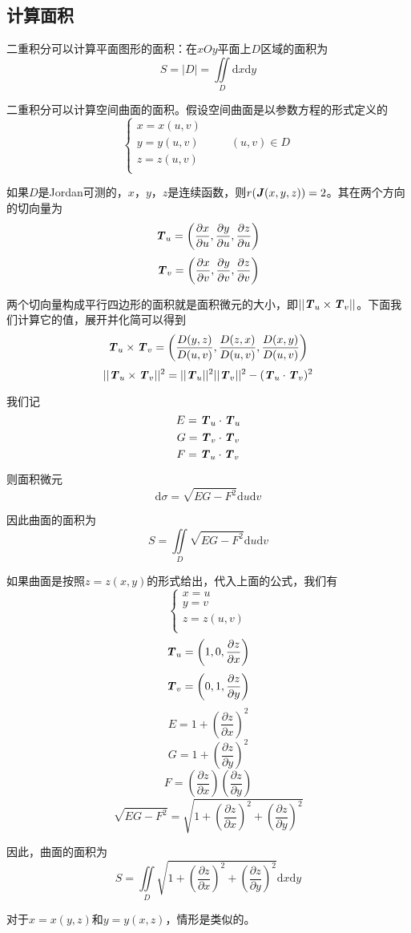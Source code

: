 \documentclass[UTF8,openany]{book}
\begin{document}
	\subsection{计算面积}
	二重积分可以计算平面图形的面积：在$xOy$平面上$D$区域的面积为
	$$S=|D|=\iint\limits_{D}\mathrm{d}x\mathrm{d}y$$
	\par 二重积分可以计算空间曲面的面积。假设空间曲面是以参数方程的形式定义的
	$$\begin{cases}
	x=x(u,v)\\
	y=y(u,v)\quad & \quad(u,v)\in D\\
	z=z(u,v)\\
	\end{cases}$$
	\par 如果$D$是Jordan可测的，$x$，$y$，$z$是连续函数，则$r(\textbf{\textit{J}}(x,y,z))=2$。其在两个方向的切向量为
	$$\textbf{\textit{T}}_u=\left(\frac{\partial x}{\partial u},\frac{\partial y}{\partial u},\frac{\partial z}{\partial u}\right)$$
	$$\textbf{\textit{T}}_v=\left(\frac{\partial x}{\partial v},\frac{\partial y}{\partial v},\frac{\partial z}{\partial v}\right)$$
	\par 两个切向量构成平行四边形的面积就是面积微元的大小，即$||\textbf{\textit{T}}_u\times \textbf{\textit{T}}_v||$。下面我们计算它的值，展开并化简可以得到
	$$\textbf{\textit{T}}_u\times \textbf{\textit{T}}_v=\left(\frac{D(y,z)}{D(u,v)},\frac{D(z,x)}{D(u,v)},\frac{D(x,y)}{D(u,v)}\right)$$
	$$||\textbf{\textit{T}}_u\times\textbf{\textit{T}}_v||^2=||\textbf{\textit{T}}_u||^2||\textbf{\textit{T}}_v||^2-(\textbf{\textit{T}}_u\cdot \textbf{\textit{T}}_v)^2$$
	\par 我们记
	$$E=\textbf{\textit{T}}_u\cdot \textbf{\textit{T}}_u$$
	$$G=\textbf{\textit{T}}_v\cdot \textbf{\textit{T}}_v$$
	$$F=\textbf{\textit{T}}_u\cdot \textbf{\textit{T}}_v$$
	\par 则面积微元
	$$\mathrm{d}\sigma=\sqrt{EG-F^2}\mathrm{d}u\mathrm{d}v$$
	\par 因此曲面的面积为
	$$S=\iint\limits_{D}\sqrt{EG-F^2}\mathrm{d}u\mathrm{d}v$$
	\par 如果曲面是按照$z=z(x,y)$的形式给出，代入上面的公式，我们有
	$$\begin{cases}
	x=u\\
	y=v\\
	z=z(u,v)\\
	\end{cases}$$
	$$\textbf{\textit{T}}_u=\left(1,0,\frac{\partial z}{\partial x}\right)$$
	$$\textbf{\textit{T}}_v=\left(0,1,\frac{\partial z}{\partial y}\right)$$
	$$E=1+\left(\frac{\partial z}{\partial x}\right)^2$$
	$$G=1+\left(\frac{\partial z}{\partial y}\right)^2$$
	$$F=\left(\frac{\partial z}{\partial x}\right)\left(\frac{\partial z}{\partial y}\right)$$
	$$\sqrt{EG-F^2}=\sqrt{1+\left(\frac{\partial z}{\partial x}\right)^2+\left(\frac{\partial z}{\partial y}\right)^2}$$
	\par 因此，曲面的面积为
	$$S=\iint\limits_{D}\sqrt{1+\left(\frac{\partial z}{\partial x}\right)^2+\left(\frac{\partial z}{\partial y}\right)^2}\mathrm{d}x\mathrm{d}y$$
	\par 对于$x=x(y,z)$和$y=y(x,z)$，情形是类似的。
\end{document}
